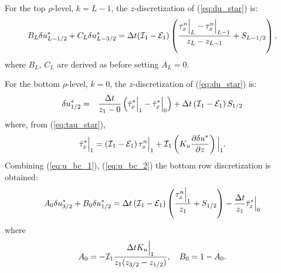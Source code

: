 \documentclass{UMDP_article}
\begin{document}
For the top $\rho$-level, $k=L-1$, the $z$-discretization of
(\ref{eq:du_star}) is:
\begin{equation}
  B_{L}\delta u_{L-1/2}^{*}+C_{L}\delta u_{L-3/2}^{*}=\Delta t({\cal I}_{1}-{\cal E}_{1})\left(\frac{\tau_{x}^{n}\Big|_{L}-\tau_{x}^{n}\Big|_{L-1}}{z_{L}-z_{L-1}}+S_{L-1/2}\right),\label{eq:tridiag_top}
\end{equation}
where $B_{L}$, $C_{L}$ are derived as before setting $A_{L}=0$.

For the bottom $\rho$-level, $k=0$, the $z$-discretization of
(\ref{eq:du_star}) is:
\begin{eqnarray}
  \delta u_{1/2}^{*} & = & \frac{\Delta t}{z_{1}-0}\left(\bar{\tau}_{x}^{*}\Big|_{1}-\bar{\tau}_{x}^{*}\Big|_{0}\right)+\Delta t\left({\cal I}_{1}-{\cal E}_{1}\right)S_{1/2}\label{eq:u_bc_1}
\end{eqnarray}
where, from (\ref{eq:tau_star}),
\begin{equation}
  \bar{\tau}_{x}^{*}\Big|_{1}=\left({\cal I}_{1}-{\cal E}_{1}\right)\tau_{x}^{n}\Big|_{1}+{\cal I}_{1}\left(K_{u}\frac{\partial\delta u^{*}}{\partial z}\right)\Big|_{1}.\label{eq:u_bc_2}
\end{equation}
Combining (\ref{eq:u_bc_1}), (\ref{eq:u_bc_2}) the bottom row
discretization is obtained:
\begin{equation}
  A_{0}\delta u_{3/2}^{*}+B_{0}\delta u_{1/2}^{*}=\Delta t\left({\cal I}_{1}-{\cal E}_{1}\right)\left(\frac{\tau_{x}^{n}\Big|_{1}}{z_{1}}+S_{1/2}\right)-\frac{\Delta t}{z_{1}}\bar{\tau}_{x}^{*}\Big|_{0}\label{eq:u_bc_3}
\end{equation}
where
\begin{equation*}
  A_{0}=-{\cal I}_{1}\frac{\Delta tK_{u}\Big|_{1}}{z_{1}(z_{3/2}-z_{1/2})},\quad B_{0}=1-A_{0}.
\end{equation*}
\end{document}

